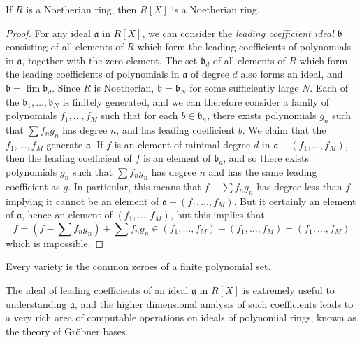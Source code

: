 \begin{theorem}
    If $R$ is a Noetherian ring, then $R[X]$ is a Noetherian ring.
\end{theorem}
\begin{proof}
    For any ideal $\mathfrak{a}$ in $R[X]$, we can consider the {\it leading coefficient ideal} $\mathfrak{b}$ consisting of all elements of $R$ which form the leading coefficients of polynomials in $\mathfrak{a}$, together with the zero element. The set $\mathfrak{b}_d$ of all elements of $R$ which form the leading coefficients of polynomials in $\mathfrak{a}$ of degree $d$ also forms an ideal, and $\mathfrak{b} = \lim \mathfrak{b}_d$. Since $R$ is Noetherian, $\mathfrak{b} = \mathfrak{b}_N$ for some sufficiently large $N$. Each of the $\mathfrak{b}_1, \dots, \mathfrak{b}_N$ is finitely generated, and we can therefore consider a family of polynomials $f_1, \dots, f_M$ such that for each $b \in \mathfrak{b}_n$, there exists polynomials $g_n$ such that $\sum f_n g_n$ has degree $n$, and has leading coefficient $b$. We claim that the $f_1, \dots, f_M$ generate $\mathfrak{a}$. If $f$ is an element of minimal degree $d$ in $\mathfrak{a} - (f_1, \dots, f_M)$, then the leading coefficient of $f$ is an element of $\mathfrak{b}_d$, and so there exists polynomials $g_n$ such that $\sum f_n g_n$ has degree $n$ and has the same leading coefficient as $g$. In particular, this means that $f - \sum f_n g_n$ has degree less than $f$, implying it cannot be an element of $\mathfrak{a} - (f_1, \dots, f_M)$. But it certainly an element of $\mathfrak{a}$, hence an element of $(f_1, \dots, f_M)$, but this implies that
    \[ f = (f - \sum f_n g_n) + \sum f_n g_n \in (f_1, \dots, f_M) + (f_1, \dots, f_M) = (f_1, \dots, f_M) \]
    which is impossible.
\end{proof}

\begin{corollary}
    Every variety is the common zeroes of a finite polynomial set.
\end{corollary}

The ideal of leading coefficients of an ideal $\mathfrak{a}$ in $R[X]$ is extremely useful to understanding $\mathfrak{a}$, and the higher dimensional analysis of such coefficients leads to a very rich area of computable operations on ideals of polynomial rings, known as the theory of Gr\"{o}bner bases.

